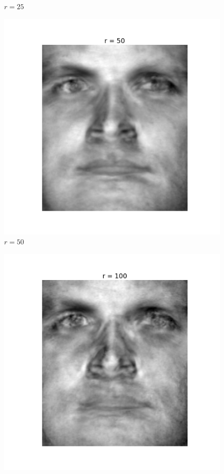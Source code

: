 \begin{enumerate}[label=\arabic*.]
\begin{mdframed}[style=MyFrame]
\begin{figure}[H]
                    \caption{$r=25$}
                \end{figure}
                \begin{figure}[H]
                    \includegraphics[height=0.35\textheight]{../media/r-50-2.png}
                    \caption{$r=50$}
                \end{figure}
                \begin{figure}[H]
                    \includegraphics[height=0.35\textheight]{../media/r-100-2.png}

\end{figure}
\end{mdframed}
\end{enumerate}
